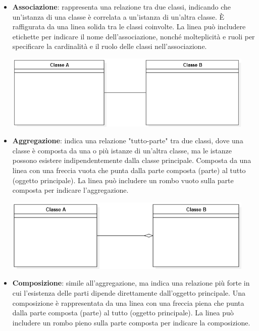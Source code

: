\begin{itemize}
	\item \textbf{Associazione}:  rappresenta una relazione tra due classi, indicando che un'istanza di una classe è correlata a un'istanza di un'altra classe. È raffigurata da una linea solida tra le classi coinvolte. La linea può includere etichette per indicare il nome dell'associazione, nonché molteplicità e ruoli per specificare la cardinalità e il ruolo delle classi nell'associazione.
		\begin{center}
			\includegraphics*[width=12cm]{../../../images/norme_di_progetto/associazioneClassi.png}
		\end{center}
	\newpage
	\item \textbf{Aggregazione}:  indica una relazione "tutto-parte" tra due classi, dove una classe è composta da una o più istanze di un'altra classe, ma le istanze possono esistere indipendentemente dalla classe principale. Composta da una linea con una freccia vuota che punta dalla parte composta (parte) al tutto (oggetto principale). La linea può includere un rombo vuoto sulla parte composta per indicare l'aggregazione.
		\begin{center}
			\includegraphics*[width=12cm]{../../../images/norme_di_progetto/aggregazioneClassi.png}
		\end{center}
	\item \textbf{Composizione}: simile all'aggregazione, ma indica una relazione più forte in cui l'esistenza delle parti dipende direttamente dall'oggetto principale. Una composizione è rappresentata da una linea con una freccia piena che punta dalla parte composta (parte) al tutto (oggetto principale). La linea può includere un rombo pieno sulla parte composta per indicare la composizione.

\end{itemize}
